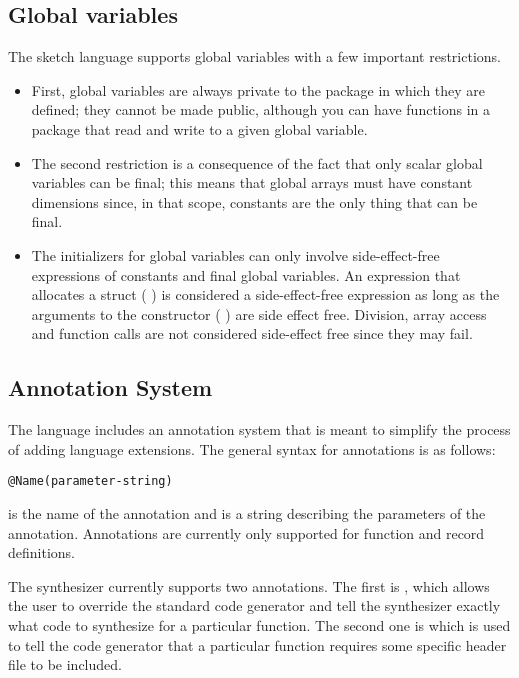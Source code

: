 \subsection{Global variables}
The sketch language supports global variables with a few important restrictions.
\begin{itemize}
\item First, global variables are always private to the package in which they are defined; they cannot be made public, although you can have functions in a package that read and write to a given global variable. 
\item The second restriction is a consequence of the fact that only scalar global variables can be final; this means that global arrays must have constant dimensions since, in that scope, constants are the only thing that can be final.

\item The initializers for global variables can only involve side-effect-free expressions of constants and final global variables. An expression that allocates a struct (\eg{} ) is considered a side-effect-free expression as long as the arguments to the constructor (\eg{} ) are side effect free. Division, array access and function calls are not considered side-effect free since they may fail.
\end{itemize}

\subsection{Annotation System}
The \Sk{} language includes an annotation system that is meant to simplify the process of adding language extensions. The general syntax for annotations is as follows:
\begin{lstlisting}
@Name(parameter-string)
\end{lstlisting}
 is the name of the annotation and  is a string describing the parameters of the annotation. Annotations are currently only supported for function and record definitions. 

The synthesizer currently supports two annotations. The first is , which allows the user to override the standard code generator and tell the synthesizer exactly what code to synthesize for a particular function. The second one is  which is used to tell the code generator that a particular function requires some specific header file to be included.

